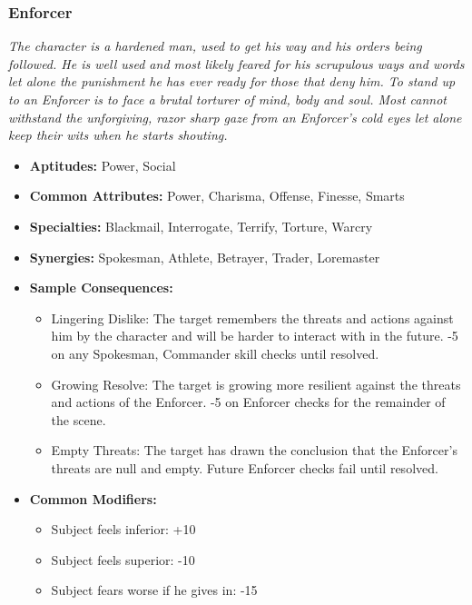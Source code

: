 \subsubsection{Enforcer}\label{Enforcer}
\textit{The character is a hardened man, used to get his way and his orders being followed. 
He is well used and most likely feared for his scrupulous ways and words let alone the punishment he has ever ready for those that deny him.
To stand up to an Enforcer is to face a brutal torturer of mind, body and soul. 
Most cannot withstand the unforgiving, razor sharp gaze from an Enforcer's cold eyes let alone keep their wits when he starts shouting.}
\begin{itemize}
	\item \textbf{Aptitudes:} Power, Social
	\item \textbf{Common Attributes:} Power, Charisma, Offense, Finesse, Smarts
	\item \textbf{Specialties:} Blackmail, Interrogate, Terrify, Torture, Warcry
	\item \textbf{Synergies:} Spokesman, Athlete, Betrayer, Trader, Loremaster
	\item \textbf{Sample Consequences:} 
	\begin{itemize}
		\item Lingering Dislike: The target remembers the threats and actions against him by the character and will be harder to interact with in the future. -5 on any Spokesman, Commander skill checks until resolved.
		\item Growing Resolve: The target is  growing more resilient against the threats and actions of the Enforcer. -5 on Enforcer checks for the remainder of the scene.
		\item Empty Threats: The target has drawn the conclusion that the Enforcer's threats are null and empty. Future Enforcer checks fail until resolved.
	\end{itemize}
	\item \textbf{Common Modifiers:}
	\begin{itemize}
		\item Subject feels inferior: +10
		\item Subject feels superior: -10
		\item Subject fears worse if he gives in: -15 
	\end{itemize}
\end{itemize}

